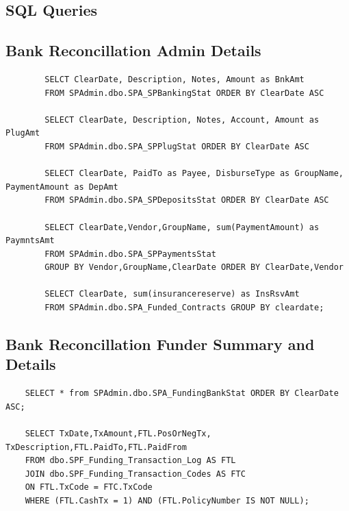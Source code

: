 \documentclass[titlepage]{article}
\begin{document}
\begin{appendices}
	\section{SQL Queries}
	\subsection {Bank Reconcillation Admin Details}
		\label{appendix:sql1}
		\begin{verbatim}
		SELCT ClearDate, Description, Notes, Amount as BnkAmt 
		FROM SPAdmin.dbo.SPA_SPBankingStat ORDER BY ClearDate ASC
		
		SELECT ClearDate, Description, Notes, Account, Amount as PlugAmt 
		FROM SPAdmin.dbo.SPA_SPPlugStat ORDER BY ClearDate ASC
		
		SELECT ClearDate, PaidTo as Payee, DisburseType as GroupName, PaymentAmount as DepAmt 
		FROM SPAdmin.dbo.SPA_SPDepositsStat ORDER BY ClearDate ASC
		
		SELECT ClearDate,Vendor,GroupName, sum(PaymentAmount) as PaymntsAmt 
		FROM SPAdmin.dbo.SPA_SPPaymentsStat 
		GROUP BY Vendor,GroupName,ClearDate ORDER BY ClearDate,Vendor
		
		SELECT ClearDate, sum(insurancereserve) as InsRsvAmt 
		FROM SPAdmin.dbo.SPA_Funded_Contracts GROUP BY cleardate;
		\end{verbatim}
	\subsection{Bank Reconcillation Funder Summary and Details}
		\label{appendix:sql2}
	\begin{verbatim}
	SELECT * from SPAdmin.dbo.SPA_FundingBankStat ORDER BY ClearDate ASC;
	
	SELECT TxDate,TxAmount,FTL.PosOrNegTx, TxDescription,FTL.PaidTo,FTL.PaidFrom
	FROM dbo.SPF_Funding_Transaction_Log AS FTL 
	JOIN dbo.SPF_Funding_Transaction_Codes AS FTC 
	ON FTL.TxCode = FTC.TxCode 
	WHERE (FTL.CashTx = 1) AND (FTL.PolicyNumber IS NOT NULL);
	\end{verbatim}

\end{appendices}
\end{document}
